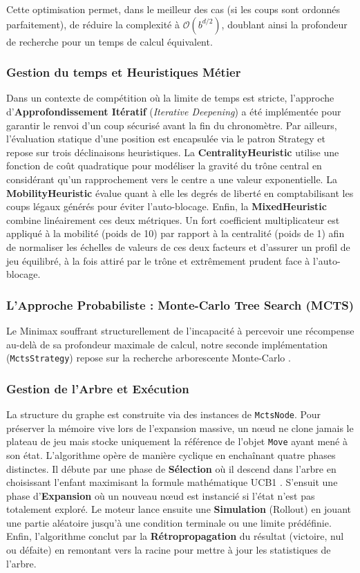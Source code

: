\documentclass[a4paper]{article}
\begin{document}
Cette optimisation permet, dans le meilleur des cas (si les coups sont ordonnés parfaitement), de réduire la complexité à $\mathcal{O}(b^{d/2})$, doublant ainsi la profondeur de recherche pour un temps de calcul équivalent.

\subsubsection{Gestion du temps et Heuristiques Métier}
Dans un contexte de compétition où la limite de temps est stricte, l'approche d'\textbf{Approfondissement Itératif} (\textit{Iterative Deepening}) a été implémentée pour garantir le renvoi d'un coup sécurisé avant la fin du chronomètre. Par ailleurs, l'évaluation statique d'une position est encapsulée via le patron Strategy et repose sur trois déclinaisons heuristiques. La \textbf{CentralityHeuristic} utilise une fonction de coût quadratique pour modéliser la gravité du trône central en considérant qu'un rapprochement vers le centre a une valeur exponentielle. La \textbf{MobilityHeuristic} évalue quant à elle les degrés de liberté en comptabilisant les coups légaux générés pour éviter l'auto-blocage. Enfin, la \textbf{MixedHeuristic} combine linéairement ces deux métriques. Un fort coefficient multiplicateur est appliqué à la mobilité (poids de 10) par rapport à la centralité (poids de 1) afin de normaliser les échelles de valeurs de ces deux facteurs et d'assurer un profil de jeu équilibré, à la fois attiré par le trône et extrêmement prudent face à l'auto-blocage.

\subsubsection{L'Approche Probabiliste : Monte-Carlo Tree Search (MCTS)}

Le Minimax souffrant structurellement de l'incapacité à percevoir une récompense au-delà de sa profondeur maximale de calcul, notre seconde implémentation (\texttt{MctsStrategy}) repose sur la recherche arborescente Monte-Carlo \cite{coulom2006efficient}.

\subsubsection{Gestion de l'Arbre et Exécution}
La structure du graphe est construite via des instances de \texttt{MctsNode}. Pour préserver la mémoire vive lors de l'expansion massive, un nœud ne clone jamais le plateau de jeu mais stocke uniquement la référence de l'objet \texttt{Move} ayant mené à son état. L'algorithme opère de manière cyclique en enchaînant quatre phases distinctes. Il débute par une phase de \textbf{Sélection} où il descend dans l'arbre en choisissant l'enfant maximisant la formule mathématique UCB1 \cite{kocsis2006bandit}. S'ensuit une phase d'\textbf{Expansion} où un nouveau nœud est instancié si l'état n'est pas totalement exploré. Le moteur lance ensuite une \textbf{Simulation} (Rollout) en jouant une partie aléatoire jusqu'à une condition terminale ou une limite prédéfinie. Enfin, l'algorithme conclut par la \textbf{Rétropropagation} du résultat (victoire, nul ou défaite) en remontant vers la racine pour mettre à jour les statistiques de l'arbre.
\end{document}
